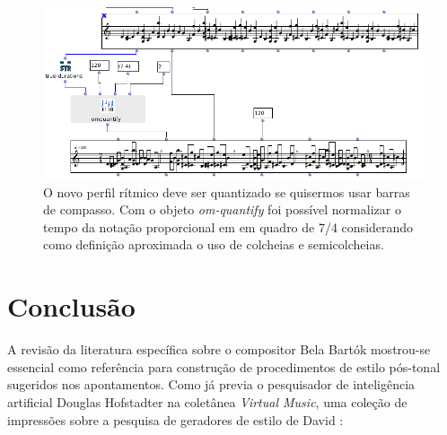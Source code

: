 \documentclass[
	12pt,				%
	openright,			%
	twoside,			%
	a4paper,			%
	english,			%
	french,				%
	spanish,			%
	brazil				%
	]{abntex2}
\begin{document}
\pagebreak
\begin{figure}[!h]
	\caption{\label{fig_grafico}O novo perfil rítmico deve ser quantizado se quisermos usar barras de compasso. Com o objeto \textit{om-quantify} foi possível normalizar o tempo da notação proporcional em em quadro de 7/4 considerando como definição aproximada o uso de colcheias e semicolcheias.  }
	\begin{center}
	    \includegraphics[scale=0.65]{OMPD/OMquantify.png}
	\end{center}
\end{figure}



\chapter*[Conclusão]{Conclusão}
\label{conclusao}

A revisão da literatura específica sobre o compositor Bela Bartók mostrou-se essencial como referência para construção de procedimentos de estilo pós-tonal sugeridos nos apontamentos. Como já previa o pesquisador de inteligência artificial Douglas Hofstadter na coletânea \textit{Virtual Music}, uma coleção de impressões sobre a pesquisa de geradores de estilo de David  :
\end{document}
